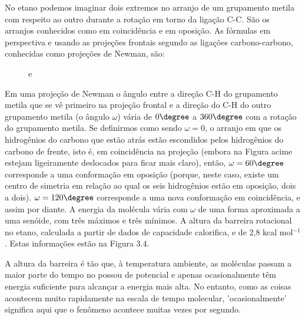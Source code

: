 No etano podemos imaginar dois extremos no arranjo de um grupamento metila com respeito ao outro durante a rotação em torno da ligação C-C. São os arranjos conhecidos como em coincidência e em oposição. As fórmulas em perspectiva e usando as projeções frontais segundo as ligações carbono-carbono, conhecidas como projeções de Newman, são: 

\begin{figure}[H]
    \centering
    \quad e \quad
    \quad\quad\quad
    \chemnameinit{}
    \quad\quad\quad
    \chemnameinit{}
\end{figure}

Em uma projeção de Newman o ângulo entre a direção C-H do grupamento metila que se vê primeiro na projeção frontal e a direção do C-H do outro grupamento metila (o ângulo $\omega$) vária de $0\degree$ a $360\degree$ com a rotação do grupamento metila. Se definirmos como sendo $\omega = 0$, o arranjo em que os hidrogênios do carbono que estão atrás estão escondidos pelos hidrogênios do carbono de frente, isto é, em coincidência na projeção (embora na Figura acime estejam ligeiramente deslocados para ficar mais claro), então, $\omega = 60\degree$ corresponde a uma conformação em oposição (porque, neste caso, existe um centro de simetria em relação ao qual os seis hidrogênios estão em oposição, dois a dois). $\omega=120\degree$ corresponde a uma nova conformação em coincidência, e assim por diante. A energia da molécula vária com $\omega$ de uma forma aproximada a uma senóide, com três máximos e três mínimos. A altura da barreira rotacional no etano, calculada a partir de dados de capacidade calorifica, e de 2,8 kcal mol$^{-1}$. Estas informações estão na Figura 3.4. 

A altura da barreira é tão que, à temperatura ambiente, as moléculas passam a maior parte do tempo no possou de potencial e apenas ocasionalmente têm energia suficiente para alcançar a energia mais alta. No entanto, como as coisas acontecem muito rapidamente na escala de tempo molecular, 'ocasionalmente' significa aqui que o fenômeno acontece muitas vezes por segundo.


